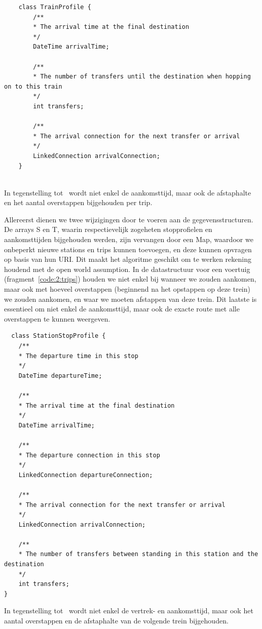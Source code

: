 \begin{listing}[htb]
	\begin{verbatim}
	class TrainProfile {
		/**
		* The arrival time at the final destination
		*/
		DateTime arrivalTime;
		
		/**
		* The number of transfers until the destination when hopping on to this train
		*/
		int transfers;
		
		/**
		* The arrival connection for the next transfer or arrival
		*/
		LinkedConnection arrivalConnection;
	}
	
	\end{verbatim}
	\caption[CSA: Gegevensstructuur voor trips]{In tegenstelling tot~\cite{strasser17} wordt niet enkel de aankomsttijd, maar ook de afstaphalte en het aantal overstappen bijgehouden per trip.}
	\label{code:2:trips}
\end{listing}

Allereerst dienen we twee wijzigingen door te voeren aan de gegevensstructuren. De arrays S en T, waarin respectievelijk zogeheten stopprofielen en aankomsttijden bijgehouden werden, zijn vervangen door een Map, waardoor we onbeperkt nieuwe stations en trips kunnen toevoegen, en deze kunnen opvragen op basis van hun URI. Dit maakt het algoritme geschikt om te werken rekening houdend met de open world assumption.  %
In de datastructuur voor een voertuig (fragment~\ref{code:2:trips}) houden we niet enkel bij wanneer we zouden aankomen, maar ook met hoeveel overstappen (beginnend na het opstappen op deze trein) we zouden aankomen, en waar we moeten afstappen van deze trein. Dit laatste is essentieel om niet enkel de aankomsttijd, maar ook de exacte route met alle overstappen te kunnen weergeven. 

\begin{listing}[htb]
\begin{verbatim}
  class StationStopProfile {
	/**
	* The departure time in this stop
	*/
	DateTime departureTime;
	
	/**
	* The arrival time at the final destination
	*/
	DateTime arrivalTime;
	
	/**
	* The departure connection in this stop
	*/
	LinkedConnection departureConnection;
	
	/**
	* The arrival connection for the next transfer or arrival
	*/
	LinkedConnection arrivalConnection;
	
	/**
	* The number of transfers between standing in this station and the destination
	*/
	int transfers;
}
	\end{verbatim}
		\caption[CSA: Gegevensstructuur voor stopprofielen]{In tegenstelling tot~\cite{strasser17} wordt niet enkel de vertrek- en aankomsttijd, maar ook het aantal overstappen en de afstaphalte van de volgende trein bijgehouden.}
	\label{code:2:stations}
\end{listing}


